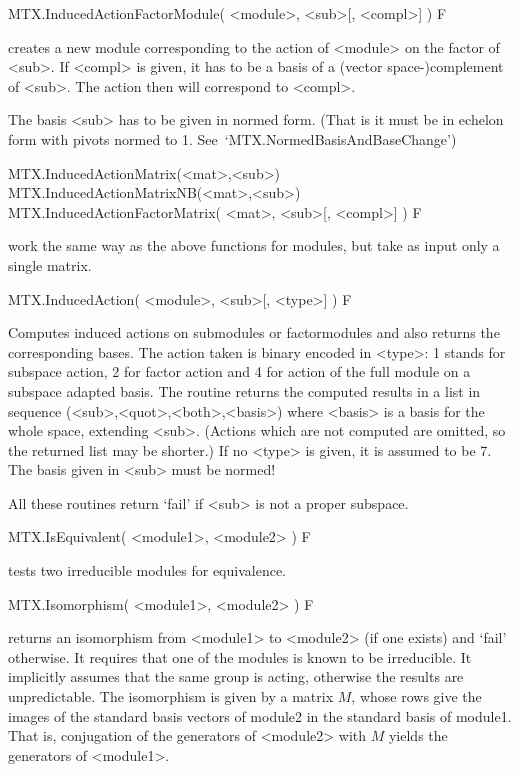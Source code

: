 \>MTX.InducedActionFactorModule( <module>, <sub>[, <compl>] ) F

creates a new module corresponding to the action of <module> on the
factor of <sub>. If <compl> is given, it has to be a basis of a
(vector space-)complement of <sub>. The action then will correspond to
<compl>.

The basis <sub> has to be given in normed form. (That is it must be in
echelon form with pivots normed to 1. See~`MTX.NormedBasisAndBaseChange')

\>MTX.InducedActionMatrix(<mat>,<sub>)
\>MTX.InducedActionMatrixNB(<mat>,<sub>)
\>MTX.InducedActionFactorMatrix( <mat>, <sub>[, <compl>] ) F

work the same way as the above functions for modules, but take as input only
a single matrix.

\>MTX.InducedAction( <module>, <sub>[, <type>] ) F

Computes induced actions on submodules or factormodules and also returns the
corresponding bases. The action taken is binary encoded in <type>:
1 stands for subspace action, 2 for
factor action and 4 for action of the full module
on a subspace adapted basis.
The routine returns the computed results in a list in sequence
(<sub>,<quot>,<both>,<basis>) where <basis> is a basis for the whole space,
extending <sub>. (Actions which are not computed are omitted, so the
returned list may be shorter.)
If no <type> is given, it is assumed to be 7.
The basis given in <sub> must be normed!

All these routines return `fail' if <sub> is not a proper subspace.


\>MTX.IsEquivalent( <module1>, <module2> ) F

tests two irreducible modules for equivalence.

\>MTX.Isomorphism( <module1>, <module2> ) F

returns an isomorphism from <module1> to <module2> (if one exists) and 
`fail' otherwise. It requires that one of the modules is known to be
irreducible. It implicitly assumes that the same group is acting, otherwise
the results are unpredictable.
The isomorphism is given by a matrix $M$, whose rows give the images of the
standard basis vectors of module2 in the standard basis of module1. That is,
conjugation of the generators of <module2> with $M$ yields the
generators of <module1>.

